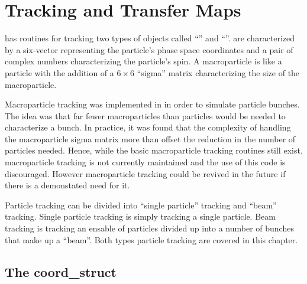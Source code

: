 \chapter{Tracking and Transfer Maps}
\label{c:tracking}

\bmad has routines for tracking two types of objects called
``'' and ``''.  are
characterized by a six-vector representing the particle's phase space
coordinates and a pair of complex numbers characterizing the
particle's spin.  A macroparticle is like a particle with the
addition of a $6\times 6$ ``sigma'' matrix characterizing the size of
the macroparticle.

Macroparticle tracking was implemented in \bmad in order to simulate particle bunches.
The idea was that far fewer macroparticles than particles would 
be needed to characterize a bunch. In practice, it was found that the complexity 
of handling the macroparticle sigma matrix more than offset the reduction in the
number of particles needed. Hence, while the basic macroparticle tracking 
routines still exist, macroparticle tracking is not currently maintained
and the use of this code is discouraged. However macroparticle tracking could be revived
in the future if there is a demonstated need for it.

Particle tracking can be divided into ``single particle'' tracking and ``beam''
tracking. Single particle tracking is simply tracking a single particle.
Beam tracking is tracking an ensable of particles divided up into a number of bunches
that make up a ``beam''. Both types particle tracking are covered in this
chapter.

\section{The coord_struct}

